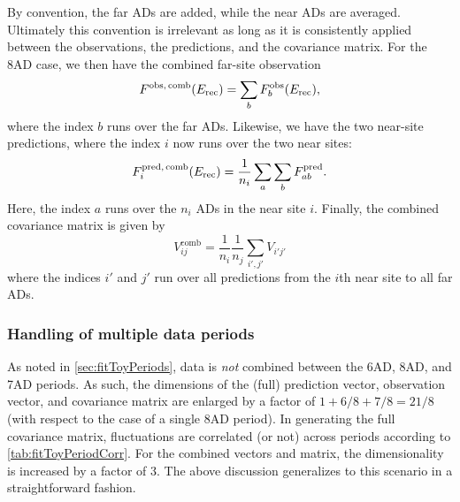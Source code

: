 \documentclass[../thesis.tex]{subfiles}
\begin{document}
By convention, the far ADs are added, while the near ADs are averaged. Ultimately this convention is irrelevant as long as it is consistently applied between the observations, the predictions, and the covariance matrix. For the 8AD case, we then have the combined far-site observation
\begin{equation*}
  F^{\mathrm{obs},\,\mathrm{comb}}(E_\mathrm{rec}) = \sum_b F^{\mathrm{obs}}_b(E_\mathrm{rec}),
\end{equation*}
where the index $b$ runs over the far ADs. Likewise, we have the two near-site predictions, where the index $i$ now runs over the two near sites:
\begin{equation*}
  F^{\mathrm{pred},\,\mathrm{comb}}_i (E_\mathrm{rec}) = \frac{1}{n_i} \sum_a \sum_b F^{\mathrm{pred}}_{ab}.
\end{equation*}
Here, the index $a$ runs over the $n_i$ ADs in the near site $i$. Finally, the combined covariance matrix is given by
\begin{equation*}
  V^{\mathrm{comb}}_{ij} = \frac{1}{n_i} \frac{1}{n_j} \sum_{i',j'} V_{i'j'}
\end{equation*}
where the indices $i'$ and $j'$ run over all predictions from the $i$th near site to all far ADs.

\subsubsection{Handling of multiple data periods}

As noted in \autoref{sec:fitToyPeriods}, data is \emph{not} combined between the 6AD, 8AD, and 7AD periods. As such, the dimensions of the (full) prediction vector, observation vector, and covariance matrix are enlarged by a factor of $1 + 6/8 + 7/8 = 21/8$ (with respect to the case of a single 8AD period). In generating the full covariance matrix, fluctuations are correlated (or not) across periods according to \autoref{tab:fitToyPeriodCorr}. For the combined vectors and matrix, the dimensionality is increased by a factor of 3. The above discussion generalizes to this scenario in a straightforward fashion.

\begin{comment}
What do we ultimately get? Check P14A technote. 2 (near sites) x 3 (periods) = 4 predictions, over 37 energy bins. Size of covariance matrix is thus 37 x 2 x 3.
\end{comment}

\begin{comment}
Data is summed across all ADs in each near site.
\end{comment}
\end{document}
